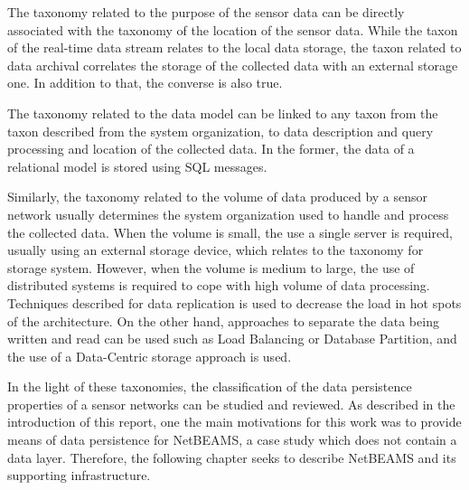 The taxonomy related to the purpose of the sensor data can be directly associated 
with the taxonomy of the location of the sensor data. While the taxon of the 
real-time data stream relates to the local data storage, the taxon related to
data archival correlates the storage of the collected data with an external
storage one. In addition to that, the converse is also true.

The taxonomy related to the data model can be linked to any taxon from the
taxon described from the system organization, to data description and query
processing and location of the collected data. In the former, the data of a
relational model is stored using SQL messages.

Similarly, the taxonomy related to the volume of data produced by a sensor
network usually determines the system organization used to handle and process
the collected data. When the volume is small, the use a single server is
required, usually using an external storage device, which relates to the
taxonomy for storage system. However, when the volume is medium to large, the
use of distributed systems is required to cope with high volume of data
processing. Techniques described for data replication is used to decrease the
load in hot spots of the architecture. On the other hand, approaches to
separate the data being written and read can be used such as Load Balancing or
Database Partition, and the use of a Data-Centric storage approach is used.

In the light of these taxonomies, the classification of the data persistence
properties of a sensor networks can be studied and reviewed. As described in
the introduction of this report, one the main motivations for this work
was to provide means of data persistence for NetBEAMS, a case study which does
not contain a data layer. Therefore, the following chapter seeks to describe
NetBEAMS and its supporting infrastructure.
